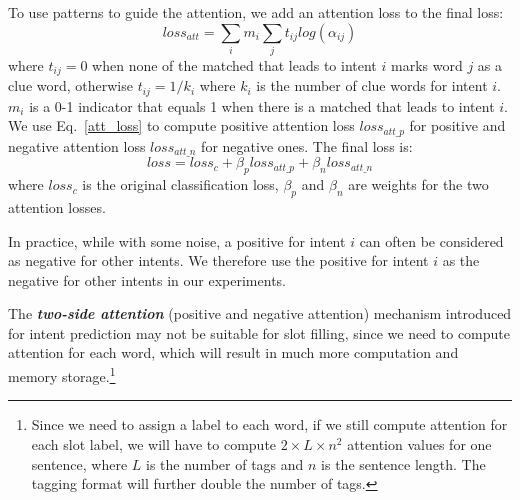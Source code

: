 To use \RE patterns to guide the attention, we add an attention loss to the final loss:
\begin{equation}
loss_{att} = \sum_{i}{m_i\sum_{j}{t_{ij}log(\alpha_{ij})}}
\label{att_loss}
\end{equation}
where $t_{ij} = 0$ when none of the matched \REs that leads to intent $i$ marks word $j$ as a clue word, otherwise $t_{ij} = 1/k_{i}$ where $k_i$ is the number of clue words
for intent $i$. $m_i$ is a 0-1 indicator that equals 1 when there is a matched \RE that leads to intent $i$. We use Eq.~\ref{att_loss} to compute positive attention loss $loss_{att\_p}$ for positive \REs and negative attention loss $loss_{att\_n}$ for negative ones. The final loss is:
\begin{equation}
loss = loss_{c} + \beta_p loss_{att\_p} + \beta_n loss_{att\_n}
\end{equation}
where $loss_{c}$ is the original classification loss, $\beta_p$ and $\beta_n$ are weights for the two attention losses.

In practice, while with some noise, a positive \RE for intent $i$ can often be considered as negative \REs for other intents. 
We therefore use the positive \REs for intent $i$ as the negative \REs for other intents in our experiments.

The \textbf{\emph{two-side attention}} (positive and negative attention) mechanism introduced for intent prediction 
may not be suitable for slot filling, since we need to compute attention for each word, which will result in much more
computation and memory storage.\footnote{Since we need to assign a label to each word, if we still compute attention for each slot label, we
will have to compute $2\times L \times n^2$ attention values for one sentence, where $L$ is the number of tags and $n$ is the sentence
length. The \BIO tagging format will further double the number of tags.}


